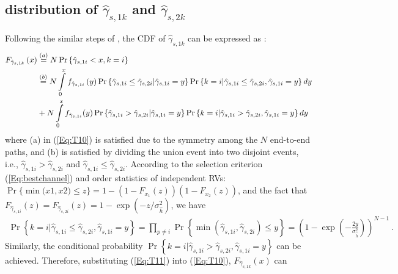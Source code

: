 \documentclass[onecolumn,letterpaper,11pt,draftclsnofoot]{IEEEtran}
\begin{document}
\subsection{distribution of $\hat \gamma_{s,1k} $ and $\hat \gamma_{s,2k} $}
Following the similar steps of \cite{Michalopoulos2010} , the CDF of
$\hat \gamma _{s,1k}$ can be expressed as :
\begin{align}\label{Eq:T10}
F_{\hat \gamma _{s,1k} } \left( x \right) & \buildrel \left(a\right)
\over= N\Pr \left\{ {\hat \gamma _{s,1i}  < x,k = i} \right\}
\\\notag
& \buildrel \left(b\right) \over = N\int\limits_0^x {f_{\hat \gamma
_{s,1i} } \left(y\right)} \Pr \left\{ {\hat \gamma _{s,1i}  \le \hat
\gamma _{s,2i} |\hat \gamma _{s,1i}  = y} \right\}\Pr \left\{ {k =
i|\hat \gamma _{s,1i}  \le \hat \gamma _{s,2i} ,\hat \gamma _{s,1i}
= y} \right\}dy
\\\notag
&+ N\int\limits_0^x {f_{\hat \gamma _{s,1i} } (y)} \Pr \left\{ {\hat
\gamma _{s,1i}  > \hat \gamma _{s,2i} |\hat \gamma _{s,1i}  = y}
\right\}\Pr \left\{ {k = i|\hat \gamma _{s,1i}  > \hat \gamma
_{s,2i} ,\hat \gamma _{s,1i}  = y} \right\}dy~
\end{align}
where (a) in (\ref{Eq:T10}) is satisfied due to the symmetry among the $N$ end-to-end
paths, and (b) is satisfied by dividing the union event into two
disjoint events, i.e., $\hat \gamma _{s,1i}  > \hat \gamma _{s,2i}$
and $\hat \gamma _{s,1i}  \le \hat \gamma _{s,2i}$. According to the
selection criterion (\ref{Eq:bestchannel}) and order statistics of
independent RVs\cite{David1970}: $ \Pr \big\{ {\min \big( {x1,x2}
\big) \le z} \big\} = 1 -
\left(1-F_{x_1}\left(z\right)\right)\left(1-F_{x_2}\left(z\right)\right)
$, and the fact that $ F_{\hat \gamma _{s,1i} } \left( z \right) =
F_{\hat \gamma _{s,2i} } \left( z \right) = 1 - \exp \left( { -
z/\sigma _{\hat h}^2 } \right) $, we have
\begin{align}\label{Eq:T11}
\Pr \left\{ {k = i|\hat \gamma _{s,1i}  \le \hat \gamma _{s,2i}
,\hat \gamma _{s,1i}  = y} \right\} = \prod\limits_{p \ne i} {\Pr }
\left\{ {\min \left( {\hat \gamma _{s,1i} ,\hat \gamma _{s,2i} }
\right) \le y} \right\} = \left( {1 - \exp \left( { -
\frac{2y}{\sigma _{\hat h}^2 } }\right)} \right)^{N - 1}~.
\end{align}
Similarly, the conditional probability $ \Pr \left\{ {k = i|\hat
\gamma _{s,1i}  > \hat \gamma _{s,2i} ,\hat \gamma _{s,1i}  = y}
\right\} $ can be achieved. Therefore, substituting (\ref{Eq:T11})
into (\ref{Eq:T10}), $F_{\hat \gamma _{s,1k} } \left( x \right)$ can
\end{document}
